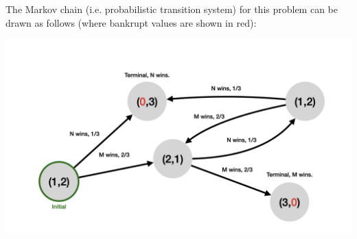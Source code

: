 \documentclass[10pt,a4paper]{article}
\begin{document}
The Markov chain (i.e. probabilistic transition system) for this problem can be drawn as follows (where bankrupt values are shown in red):
\begin{center}
    \includegraphics[scale=0.15]{diagrams/prob_diagrams/prob_diagrams.002.png}
\end{center}

% 
% 
\end{document}

